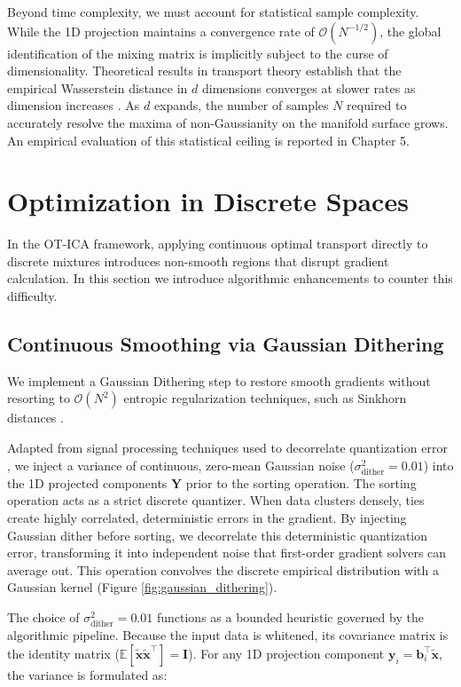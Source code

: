 \documentclass[12pt,a4paper,twoside,openany]{book}
\begin{document}
Beyond time complexity, we must account for statistical sample complexity. While the 1D projection maintains a convergence rate 
of $\mathcal{O}(N^{-1/2})$, the global identification of the mixing matrix is implicitly subject to the curse of dimensionality. 
Theoretical results in transport theory establish 
that the empirical Wasserstein distance in $d$ dimensions converges at slower rates as dimension increases \cite{fournier2015rate}. 
As $d$ expands, the number of samples $N$ required to accurately resolve the maxima of non-Gaussianity on the manifold surface grows. 
An empirical evaluation of this statistical ceiling is reported in Chapter 5.

\section{Optimization in Discrete Spaces}
In the OT-ICA framework, applying continuous optimal transport directly to discrete mixtures introduces non-smooth regions 
that disrupt gradient calculation. In this section we introduce algorithmic enhancements to counter this difficulty.

\subsection{Continuous Smoothing via Gaussian Dithering}
We implement a Gaussian Dithering step to restore smooth gradients without resorting to $\mathcal{O}(N^2)$ entropic regularization techniques, 
such as Sinkhorn distances \cite{cuturi2013sinkhorn}. 

Adapted from signal processing techniques used to decorrelate quantization error \cite{schuchman1964dither}, we inject a variance of continuous, zero-mean Gaussian noise 
($\sigma_{\text{dither}}^2 = 0.01$) into the 1D projected components $\mathbf{Y}$ prior to the sorting operation. 
The sorting operation acts as a strict discrete quantizer. When data clusters densely, ties create highly correlated, deterministic errors in the gradient. 
By injecting Gaussian dither before sorting, we decorrelate this deterministic quantization error, transforming it into independent noise that 
first-order gradient solvers can average out. This operation convolves the discrete empirical distribution with 
a Gaussian kernel (Figure \ref{fig:gaussian_dithering}).

The choice of $\sigma_{\text{dither}}^2 = 0.01$ functions as a bounded heuristic governed by the algorithmic pipeline. 
Because the input data is whitened, its covariance matrix is the identity matrix ($\mathbb{E}[\widetilde{\mathbf{x}}\widetilde{\mathbf{x}}^\top] = \mathbf{I}$). 
For any 1D projection component $\mathbf{y}_i = \mathbf{b}_i^\top \widetilde{\mathbf{x}}$, the variance is formulated as:
\end{document}
